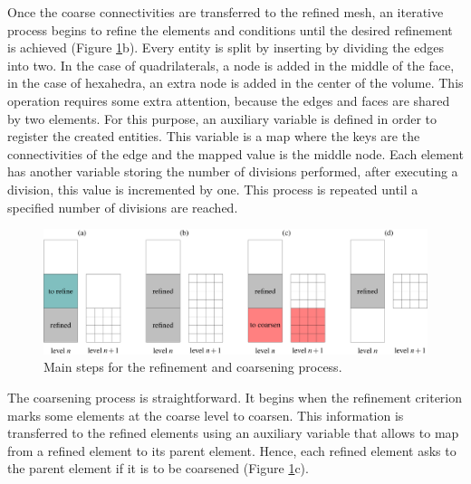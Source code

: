 Once the coarse connectivities are transferred to the refined mesh, an iterative process begins to refine the elements and conditions until the desired refinement is achieved (Figure \ref{multilevel_meshing_steps}{\color{wrmBlue}b}). Every entity is split by inserting by dividing the edges into two. In the case of quadrilaterals, a node is added in the middle of the face, in the case of hexahedra, an extra node is added in the center of the volume. This operation requires some extra attention, because the edges and faces are shared by two elements. For this purpose, an auxiliary variable is defined in order to register the created entities. This variable is a map where the keys are the connectivities of the edge and the mapped value is the middle node. Each element has another variable storing the number of divisions performed, after executing a division, this value is incremented by one. This process is repeated until a specified number of divisions are reached.

\begin{figure}
    \centering
    \includegraphics[width=\textwidth]{img/multigrid/multilevel_meshing_steps.pdf}
    \caption{Main steps for the refinement and coarsening process.}
    \label{multilevel_meshing_steps}
\end{figure}

The coarsening process is straightforward. It begins when the refinement criterion marks some elements at the coarse level to coarsen. This information is transferred to the refined elements using an auxiliary variable that allows to map from a refined element to its parent element. Hence, each refined element asks to the parent element if it is to be coarsened (Figure \ref{multilevel_meshing_steps}{\color{wrmBlue}c}).

